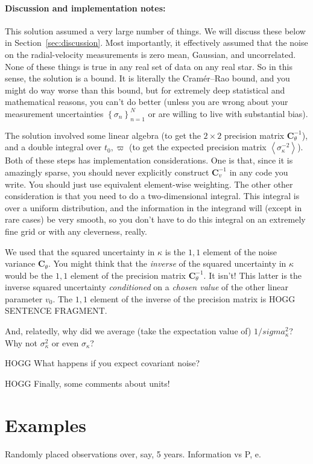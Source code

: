 \documentclass[10pt, letterpaper]{article}
\newcommand{\sectionname}{Section}
\newcommand{\inv}{^{-1}}
\newcommand{\setof}[1]{\left\{{#1}\right\}}
\newcommand{\mean}[1]{\left<{#1}\right>}
\newcommand{\tensor}[1]{\mathbf{#1}}
\newcommand{\tC}{\tensor{C}}
\newcounter{marginnote}
\renewcommand{\footnote}[1]{\refstepcounter{marginnote}\textsuperscript{\themarginnote}\marginpar{\color{darkgray}\raggedright\footnotesize\textsuperscript{\themarginnote}#1}}
\begin{document}
\paragraph{Discussion and implementation notes:}
This solution assumed a very large number of things. We will discuss these
below in \sectionname~\ref{sec:discussion}. Most importantly, it effectively
assumed that the noise on the radial-velocity measurements is zero mean,
Gaussian, and uncorrelated. None of these things is true in any real
set of data on any real star. So in this sense, the solution is a bound.
It is literally the Cram\'er--Rao bound\footnote{HOGG CITE}, and you might
do way worse than this bound, but for extremely deep statistical and
mathematical reasons, you can't do better (unless you are wrong about your
measurement uncertainties $\setof{\sigma_n}_{n=1}^N$ or are willing to live
with substantial bias).

The solution involved some linear algebra (to get the $2\times 2$
precision matrix $\tC_\theta\inv$), and a double integral over $t_0,
\varpi$ (to get the expected precision matrix
$\mean{\sigma^{-2}_\kappa}$). Both of these steps has
implementation considerations. One is that, since it
is amazingly sparse, you should never explicitly construct $\tC_v\inv$
in any code you write. You should just use equivalent element-wise
weighting.
The other other consideration is that you need to do a two-dimensional
integral. This integral is over a uniform distribution, and the information
in the integrand will (except in rare cases) be very smooth, so you don't
have to do this integral on an extremely fine grid or with any cleverness,
really.

We used that the squared uncertainty in $\kappa$ is the $1,1$ element of the
noise variance $\tC_\theta$.
You might think that the \emph{inverse} of the squared uncertainty in $\kappa$ would be
the $1,1$ element of the precision matrix $\tC_\theta\inv$.
It isn't!
This latter is the inverse squared uncertainty \emph{conditioned} on
a \emph{chosen value} of the other linear parameter $v_0$.
The $1,1$ element of the inverse of the precision matrix is HOGG SENTENCE FRAGMENT.

And, relatedly, why did we average (take the expectation value of)
$1/sigma^2_\kappa$? Why not $\sigma^2_\kappa$ or even $\sigma_\kappa$?

HOGG What happens if you expect covariant noise?

HOGG Finally, some comments about units!

\section{Examples}
Randomly placed observations over, say, 5 years. Information vs P, e.
\end{document}
